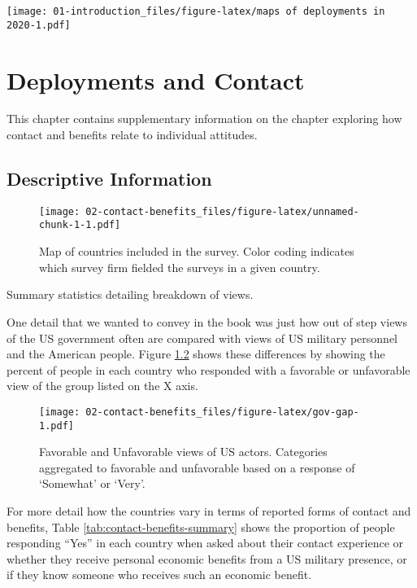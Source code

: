 \documentclass[
]{book}
\theoremstyle{definition}
\theoremstyle{definition}
\theoremstyle{definition}
\theoremstyle{definition}
\theoremstyle{remark}
\begin{document}
\texttt{[image: 01-introduction\_files/figure-latex/maps of deployments in 2020-1.pdf]}

\hypertarget{contact-benefits}{%
\chapter{Deployments and Contact}\label{contact-benefits}}

This chapter contains supplementary information on the chapter exploring how contact and benefits relate to individual attitudes.

\hypertarget{descriptive-information}{%
\section{Descriptive Information}\label{descriptive-information}}

\begin{figure}
\centering
\texttt{[image: 02-contact-benefits\_files/figure-latex/unnamed-chunk-1-1.pdf]}
\caption{\label{fig:unnamed-chunk-1}Map of countries included in the survey. Color coding indicates which survey firm fielded the surveys in a given country.}
\end{figure}

Summary statistics detailing breakdown of views.

One detail that we wanted to convey in the book was just how out of step views of the US government often are compared with views of US military personnel and the American people. Figure \ref{fig:gov-gap} shows these differences by showing the percent of people in each country who responded with a favorable or unfavorable view of the group listed on the X axis.

\begin{figure}
\centering
\texttt{[image: 02-contact-benefits\_files/figure-latex/gov-gap-1.pdf]}
\caption{\label{fig:gov-gap}Favorable and Unfavorable views of US actors. Categories aggregated to favorable and unfavorable based on a response of `Somewhat' or `Very'.}
\end{figure}

For more detail how the countries vary in terms of reported forms of contact and benefits, Table \ref{tab:contact-benefits-summary} shows the proportion of people responding ``Yes'' in each country when asked about their contact experience or whether they receive personal economic benefits from a US military presence, or if they know someone who receives such an economic benefit.
\end{document}
